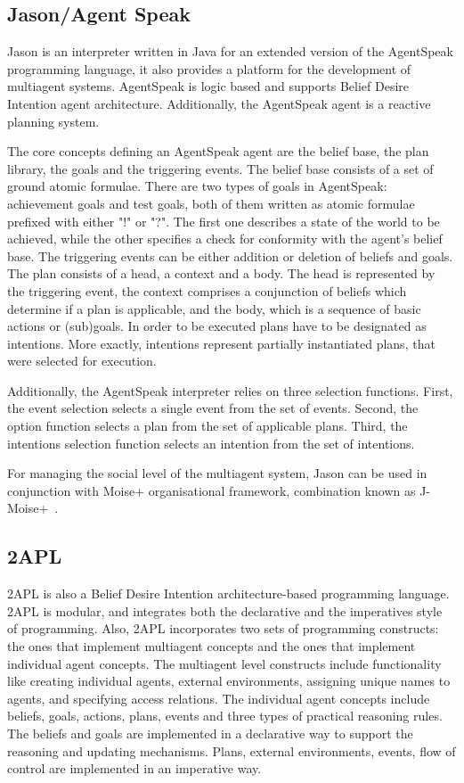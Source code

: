 \documentclass[a4paper,12pt,oneside,fleqn]{book} %
\begin{document}
\subsection{Jason/Agent Speak} %
Jason is an interpreter written in Java for an extended version of the
AgentSpeak programming language, it also provides a platform for the
development of multiagent systems. AgentSpeak is logic based and supports
Belief Desire Intention agent architecture. Additionally, the AgentSpeak
agent is a reactive planning system.

The core concepts defining an AgentSpeak agent are the belief base, the
plan library, the goals and the triggering events. The belief base consists
of a set of ground atomic formulae. There are two types of goals in
AgentSpeak: achievement goals and test goals, both of them written as
atomic formulae prefixed with either "!" or "?". The first one describes a
state of the world to be achieved, while the other specifies a check for
conformity with the agent's belief base. The triggering events can be
either addition or deletion of beliefs and goals. The plan consists of a
head, a context and a body. The head is represented by the triggering
event, the context comprises a conjunction of beliefs which determine if a
plan is applicable, and the body, which is a sequence of basic actions or
(sub)goals. In order to be executed plans have to be designated as
intentions. More exactly, intentions represent partially instantiated
plans, that were selected for execution.

Additionally, the AgentSpeak interpreter relies on three selection
functions. First, the event selection selects a single event from the set
of events. Second, the option function selects a plan from the set of
applicable plans. Third, the intentions selection function selects an
intention from the set of intentions.

For managing the social level of the multiagent system, Jason can be used
in conjunction with Moise+ organisational framework, combination known as
J-Moise+~\cite{hubner2007j}.


\subsection{2APL} %
2APL is also a Belief Desire Intention architecture-based programming
language. 2APL is modular, and integrates both the declarative and the
imperatives style of programming. Also, 2APL incorporates two sets of
programming constructs: the ones that implement multiagent concepts and the
ones that implement individual agent concepts. The multiagent level
constructs include functionality like creating individual agents, external
environments, assigning unique names to agents, and specifying access
relations. The individual agent concepts include beliefs, goals, actions,
plans, events and three types of practical reasoning rules. The beliefs and
goals are implemented in a declarative way to support the reasoning and
updating mechanisms. Plans, external environments, events, flow of control
are implemented in an imperative way.
\end{document}
